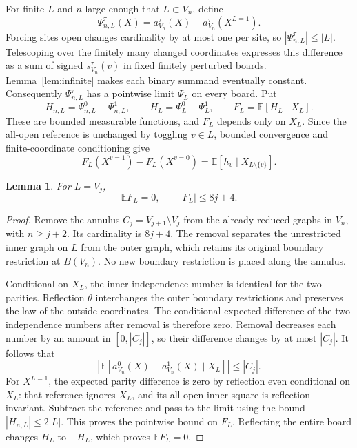 \documentclass[11pt,a4paper]{article}
\newcommand{\E}{\mathbb E}
\newtheorem{lemma}[theorem]{Lemma}
\numberwithin{equation}{section}
\begin{document}
For finite $L$ and $n$ large enough that $L\subset V_n$, define
\[
 \Psi_{n,L}^\tau(X)=a_{V_n}^\tau(X)-a_{V_n}^\tau(X^{L=1}).
\]
Forcing sites open changes cardinality by at most one per site, so
$|\Psi_{n,L}^\tau|\le |L|$. Telescoping over the finitely many changed
coordinates expresses this difference as a sum of signed $s_{V_n}^\tau(v)$
in fixed finitely perturbed boards. Lemma~\ref{lem:infinite} makes each
binary summand eventually constant. Consequently $\Psi_{n,L}^\tau$
has a pointwise limit $\Psi_L^\tau$ on every board. Put
\[
 H_{n,L}=\Psi_{n,L}^0-\Psi_{n,L}^1,\qquad
 H_L=\Psi_L^0-\Psi_L^1,\qquad F_L=\E[H_L\mid X_L].
\]
These are bounded measurable functions, and $F_L$ depends only on $X_L$.
Since the all-open reference is unchanged by toggling $v\in L$,
bounded convergence and finite-coordinate conditioning give
\begin{equation}\label{eq:toggle-F}
 F_L(X^{v=1})-F_L(X^{v=0})
 =\E[h_v\mid X_{L\setminus\{v\}}].
\end{equation}

\begin{lemma}\label{lem:surface}
For $L=V_j$,
\begin{equation}\label{eq:surface}
 \E F_L=0,\qquad |F_L|\le 8j+4.
\end{equation}
\end{lemma}
\begin{proof}
Remove the annulus $C_j=V_{j+1}\setminus V_j$ from the already reduced
graphs in $V_n$, with $n\ge j+2$. Its cardinality is $8j+4$. The removal
separates the unrestricted inner graph on $L$ from the outer graph,
which retains its original boundary restriction at $B(V_n)$.
No new boundary restriction is placed along the annulus.

Conditional on $X_L$, the inner independence number is identical for the
two parities. Reflection $\theta$ interchanges the outer boundary
restrictions and preserves the law of the outside coordinates. The
conditional expected difference of the two independence numbers after
removal is therefore zero. Removal decreases each number by an amount
in $[0,|C_j|]$, so their difference changes by at most $|C_j|$.
It follows that
\[
 \left|\E[a_{V_n}^0(X)-a_{V_n}^1(X)\mid X_L]\right|\le |C_j|.
\]
For $X^{L=1}$, the expected parity difference is zero by reflection even
conditional on $X_L$: that reference ignores $X_L$, and its all-open
inner square is reflection invariant. Subtract the reference and pass
to the limit using the bound $|H_{n,L}|\le2|L|$. This proves the pointwise
bound on $F_L$. Reflecting the entire board changes $H_L$ to $-H_L$,
which proves $\E F_L=0$.
\end{proof}
\end{document}
